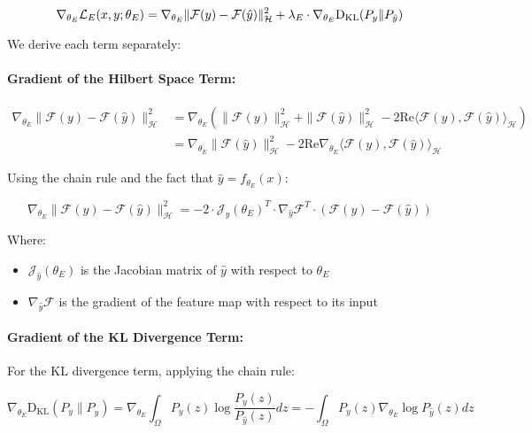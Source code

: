 \begin{equation}
\nabla_{\theta_E} \mathcal{L}_E(x, y; \theta_E) = \nabla_{\theta_E} \|\mathcal{F}(y) - \mathcal{F}(\hat{y})\|_{\mathcal{H}}^2 + \lambda_E \cdot \nabla_{\theta_E} \mathrm{D_{KL}}(P_y \| P_{\hat{y}})
\end{equation}

We derive each term separately:

\paragraph{Gradient of the Hilbert Space Term:}
\begin{equation}
\begin{aligned}
\nabla_{\theta_E} \|\mathcal{F}(y) - \mathcal{F}(\hat{y})\|_{\mathcal{H}}^2 &= \nabla_{\theta_E} \left( \|\mathcal{F}(y)\|_{\mathcal{H}}^2 + \|\mathcal{F}(\hat{y})\|_{\mathcal{H}}^2 - 2\text{Re}\langle \mathcal{F}(y), \mathcal{F}(\hat{y}) \rangle_{\mathcal{H}} \right) \\
&= \nabla_{\theta_E} \|\mathcal{F}(\hat{y})\|_{\mathcal{H}}^2 - 2\text{Re}\nabla_{\theta_E}\langle \mathcal{F}(y), \mathcal{F}(\hat{y}) \rangle_{\mathcal{H}}
\end{aligned}
\end{equation}

Using the chain rule and the fact that $\hat{y} = f_{\theta_E}(x)$:

\begin{equation}
\nabla_{\theta_E} \|\mathcal{F}(y) - \mathcal{F}(\hat{y})\|_{\mathcal{H}}^2 = -2 \cdot \mathcal{J}_{\hat{y}}(\theta_E)^T \cdot \nabla_{\hat{y}} \mathcal{F}^T \cdot (\mathcal{F}(y) - \mathcal{F}(\hat{y}))
\end{equation}

Where:
\begin{itemize}
\item $\mathcal{J}_{\hat{y}}(\theta_E)$ is the Jacobian matrix of $\hat{y}$ with respect to $\theta_E$
\item $\nabla_{\hat{y}} \mathcal{F}$ is the gradient of the feature map with respect to its input
\end{itemize}

\paragraph{Gradient of the KL Divergence Term:}
For the KL divergence term, applying the chain rule:

\begin{equation}
\nabla_{\theta_E} \mathrm{D_{KL}}(P_y \| P_{\hat{y}}) = \nabla_{\theta_E} \int_{\Omega} P_y(z) \log\frac{P_y(z)}{P_{\hat{y}}(z)} dz = -\int_{\Omega} P_y(z) \nabla_{\theta_E} \log P_{\hat{y}}(z) dz
\end{equation}

